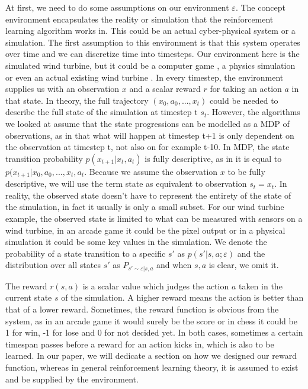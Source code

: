 \documentclass[hyperref,beleg]{cgvpub}
\begin{document}
At first, we need to do some assumptions on our environment $\varepsilon$. The concept environment encapsulates the reality or simulation that the reinforcement learning algorithm works in. This could be an actual cyber-physical system or a simulation. The first assumption to this environment is that this system operates over time and we can discretize time into timesteps. Our environment here is the simulated wind turbine, but it could be a computer game \cite{lillicrapCONTINUOUSCONTROLDEEP2015}, a physics simulation\cite{brockmanOpenAIGym2016} or even an actual existing wind turbine \cite{kolterDesignAnalysisLearning2012}. 
In every timestep, the environment supplies us with an observation \(x\) and a scalar reward \(r\) for taking an action \(a\) in that state. In theory, the full trajectory \((x_0, a_0, ..., x_t)\) could be needed to describe the full state of the simulation at timestep t \(s_t\). However, the algorithms we looked at assume that the state progressions can be modelled as a \ac{MDP} of observations, as in that what will happen at timestep t+1 is only dependent on the observation at timestep t, not also on for example t-10. In \ac{MDP}, the state transition probability \(p(x_{t+1}|x_t, a_t)\) is fully descriptive, as in it is equal to \(p(x_{t+1}|x_0, a_0, ..., x_t, a_t\). Because we assume the observation \(x\) to be fully descriptive, we will use the term state as equivalent to observation \(s_t = x_t\). In reality, the observed state doesn't have to represent the entirety of the state of the simulation, in fact it usually is only a small subset. For our wind turbine example, the observed state is limited to what can be measured with sensors on a wind turbine, in an arcade game it could be the pixel output or in a physical simulation it could be some key values in the simulation. We denote the probability of a state transition to a specific $s'$ as $p(s'|s,a;\varepsilon)$ and the distribution over all states $s'$ as $P_{s' \sim \varepsilon | s,a}$ and when $s,a$ is clear, we omit it.

The reward \(r(s,a)\) is a scalar value which judges the action $a$ taken in the current state $s$ of the simulation. A higher reward means the action is better than that of a lower reward. Sometimes, the reward function is obvious from the system, as in an arcade game it would surely be the score or in chess it could be 1 for win, -1 for lose and 0 for not decided yet. In both cases, sometimes a certain timespan passes before a reward for an action kicks in, which is also to be learned. In our paper, we will dedicate a section on how we designed our reward function, whereas in general reinforcement learning theory, it is assumed to exist and be supplied by the environment.
\end{document}
